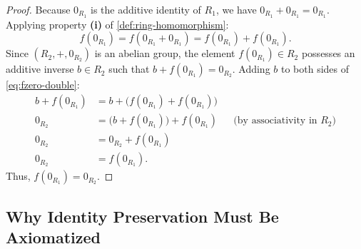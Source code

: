 \begin{content}

\begin{proof}
Because $0_{R_1}$ is the additive identity of $R_1$, we have $0_{R_1} + 0_{R_1} = 0_{R_1}$. Applying property \textbf{(i)} of \cref{def:ring-homomorphism}:
\begin{equation}\label{eq:fzero-double}
f(0_{R_1}) = f(0_{R_1} + 0_{R_1}) = f(0_{R_1}) + f(0_{R_1}).
\end{equation}
Since $(R_2, +, 0_{R_2})$ is an abelian group, the element $f(0_{R_1}) \in R_2$ possesses an additive inverse $b \in R_2$ such that $b + f(0_{R_1}) = 0_{R_2}$. Adding $b$ to both sides of \eqref{eq:fzero-double}:
\begin{align*}
b + f(0_{R_1}) &= b + \bigl( f(0_{R_1}) + f(0_{R_1}) \bigr) \\
0_{R_2} &= \bigl( b + f(0_{R_1}) \bigr) + f(0_{R_1}) && \text{(by associativity in $R_2$)} \\
0_{R_2} &= 0_{R_2} + f(0_{R_1}) \\
0_{R_2} &= f(0_{R_1}).
\end{align*}
Thus, $f(0_{R_1}) = 0_{R_2}$.
\end{proof}
\end{content}

\subsection{Why Identity Preservation Must Be Axiomatized}

